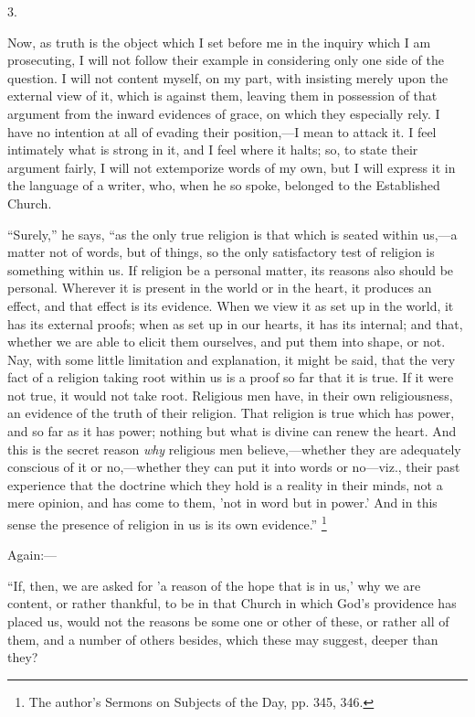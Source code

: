 3.

Now, as truth is the object which I set before me in the inquiry
which I am prosecuting, I will not follow their example in considering
only one side of the question. I will not content myself, on my part,
with insisting merely upon the external view of it, which is against
them, leaving them in possession of that argument from the inward
evidences of grace, on which they especially rely. I have no intention
at all of evading their position,—I mean to attack it. I feel
intimately what is strong in it, and I feel where it halts; so, to
state their argument fairly, I will not extemporize words of my own,
but I will express it in the language of a writer, who, when he so
spoke, belonged to the Established Church.

``Surely,'' he says, ``as the only true religion is
that which is seated within us,—a matter not of words, but of
things, so the only satisfactory test of religion is something within
us. If religion be a personal matter, its reasons also should be
personal. Wherever it is present in the world or in the heart, it
produces an effect, and that effect is its evidence. When we view it
as set up in the world, it has its external proofs; when as set up in
our hearts, it has its internal; and that, whether we are able to
elicit them ourselves, and put them into shape, or not. Nay, with some
little limitation and explanation, it might be said, that the very
fact of a religion taking root within us is a proof so far that it is
true. If it were not true, it would not take root. Religious men have,
in their own religiousness, an evidence of the truth of their
religion. That religion is true which has power, and so far as it has
power; nothing but what is divine can renew the heart. And this is the
secret reason \emph{why} religious men believe,—whether they are
adequately conscious of it or no,—whether they can put it into words
or no—viz., their past experience that the doctrine which they hold
is a reality in their minds, not a mere opinion, and has come to them,
'not in word but in power.' And in this sense the presence of religion
in us is its own evidence.'' \footnote{The author's Sermons on Subjects of the
Day, pp. 345, 346.}

Again:—

``If, then, we are asked for 'a reason of the hope that is in
us,' why we are content, or rather thankful, to be in that Church in
which God's providence has placed us, would not the reasons be some
one or other of these, or rather all of them, and a number of others
besides, which these may suggest, deeper than they?

